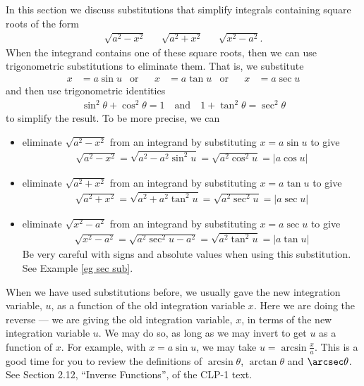 In this section we discuss substitutions that simplify integrals containing
square roots of the form
\begin{align*}
\sqrt{a^2-x^2} && \sqrt{a^2+x^2} && \sqrt{x^2-a^2}.
\end{align*}
When the integrand contains one of these square roots, then we can use
trigonometric substitutions to eliminate them. That is, we substitute
\begin{align*}
x&=a\sin u&\text{or}&&
x&=a\tan u&\text{or}&&
x&=a\sec u
\end{align*}
and then use trigonometric identities
\begin{align*}
\sin^2\theta + \cos^2\theta =1 \quad\text{and}\quad
1+\tan^2\theta= \sec^2\theta
\end{align*}
to simplify the result.  To be more precise, we can
\begin{itemize}
\item eliminate $\sqrt{a^2-x^2}$ from an integrand by substituting
$x=a\sin u$ to give
\begin{align*}
\sqrt{a^2-x^2}=\sqrt{a^2-a^2\sin^2 u}
=\sqrt{a^2\cos^2 u}=|a\cos u|
\end{align*}
\item eliminate $\sqrt{a^2+x^2}$ from an integrand by substituting
$x=a\tan u$ to give
\begin{align*}
\sqrt{a^2+x^2}=\sqrt{a^2+a^2\tan^2 u}
=\sqrt{a^2\sec^2 u}=|a\sec u|
\end{align*}
\item eliminate $\sqrt{x^2-a^2}$ from an integrand by substituting
$x=a\sec u$ to give
\begin{align*}
\sqrt{x^2-a^2}=\sqrt{a^2\sec^2u-a^2}
=\sqrt{a^2\tan^2 u}=|a\tan u|
\end{align*}
Be very careful with signs and absolute values when using this substitution.
See Example \ref{eg sec sub}.
\end{itemize}

When we have used substitutions before, we usually gave the new integration
variable, $u$, as a function of the old integration variable $x$. Here we are doing the
reverse --- we are giving the old integration variable, $x$, in terms of the new
integration variable $u$. We may do so, as long as we may invert to get $u$ as a function
of $x$. For example, with $x=a\sin u$, we may take $u=\arcsin\frac{x}{a}$.
This is a good time for you to review the definitions of $\arcsin\theta$,
$\arctan\theta$ and $\arcsec\theta$. See Section 2.12, ``Inverse Functions'',
of the CLP-1 text.

